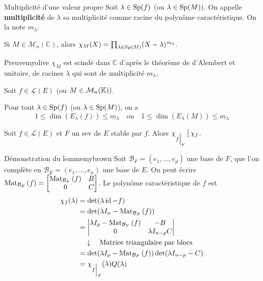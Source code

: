     \begin{defi}{Multiplicité d’une valeur propre}{}
        Soit $\lambda \in \operatorname{Sp}(f)$ (ou $\lambda \in \operatorname{Sp}(M))$. On appelle \textbf{multiplicité} de $\lambda$ sa multiplicité comme racine du polynôme caractéristique. On la note $m_{\lambda}$.
    \end{defi}

    \begin{prop}{}{}
        Si $M \in \mathcal{M}_n(\mathbb{C})$, alors $\chi_M(X) = \prod_{\lambda \in \operatorname{Sp}(M)} (X - \lambda)^{m_{\lambda}}$.
    \end{prop}

    \begin{demo}{Preuve}{myolive}
        $\chi_M$ est scindé dans $\mathbb{C}$ d’après le théorème de d’Alembert et unitaire, de racines $\lambda$ qui sont de multiplicité $m_{\lambda}$.
    \end{demo}

    \begin{prop}{}{}
        Soit $f \in \mathcal{L}(E)$ (ou $M \in \mathcal{M}_{n}(\mathbb{K}))$.

        Pour tout $\lambda \in \operatorname{Sp}(f)$ (ou $\lambda \in \operatorname{Sp}(M)$), on a 
        \[ 1 \leq \dim(E_{\lambda}(f)) \leq m_{\lambda} \quad \text{ou} \quad 1 \leq \dim(E_{\lambda}(M)) \leq m_{\lambda} \]
    \end{prop}

    \begin{lem}{}{}
        Soit $f \in \mathcal{L}(E)$ et $F$ un sev de $E$ stable par $f$. Alors $\chi_{\restr{f}{F}} \tq \chi_{f}$.
    \end{lem}
    
    \begin{demo}{Démonstration du lemme}{mybrown}
        Soit $\mathcal{B}_F = (e_1,\ldots,e_p)$ une base de $F$, que l’on complète en $\mathcal{B}_E = (e_1,\ldots, e_n)$ une base de $E$. On peut écrire $\text{Mat}_{\mathcal{B}_E}\left(f\right) = \begin{bmatrix}
            \text{Mat}_{\mathcal{B}_F}\left(f\right) & B \\
            0 & C
        \end{bmatrix}$. Le polynôme caractéristique de $f$ est 
        \begin{align*}
            \chi_f(\lambda)
            &= \det(\lambda \id - f) \\
            &= \det(\lambda I_n - \mat{\mathcal{B}_E}{f}) \\
            &= \begin{vmatrix}
                \lambda I_p - \mat{\mathcal{B}_F}{f} & - B \\
                0 & \lambda I_{n-p} C 
            \end{vmatrix} \\
            &\quad \downarrow \quad \text{Matrice triangulaire par blocs} \\
            &= \det(\lambda I_p - \mat{\mathcal{B}_F}{f}) \det(\lambda I_{n-p} - C) \\
            &= \chi_{\restr{f}{F}}(\lambda) Q(\lambda)
        \end{align*}
    \end{demo}

